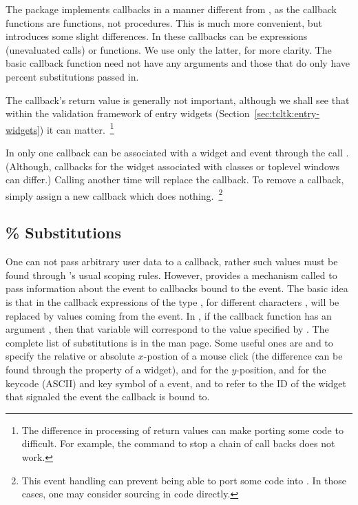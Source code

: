 The  package implements callbacks in a manner different
from \TK, as the callback functions are \R\/ functions, not \TK\/
procedures. This is much more convenient, but introduces some slight
differences.  In  these callbacks can be expressions
(unevaluated calls) or functions. We use only the latter, for more
clarity. The basic callback function need not have any arguments and
those that do only have percent substitutions passed in.


The callback's return value is generally not important, although we
shall see that within the validation framework of entry widgets
(Section~\ref{sec:tcltk:entry-widgets}) it can matter.~\footnote{The
  difference in processing of return values can make porting some
  \Tk\/ code to  difficult. For example, the 
  command to stop a chain of call backs does not work.}



In  only one callback can be associated with a widget and
event through the call
. (Although, callbacks for the
widget associated with classes or toplevel windows can differ.)
Calling  another time will replace the callback. To
remove a callback, simply assign a new callback which does
nothing.~\footnote{This event handling can prevent being able to port
  some \Tk\/ code into . In those cases, one may consider
  sourcing in \Tcl\/ code directly.}



\subsection{\% Substitutions}
\label{sec:tcltk-percent-substitutions}

One can not pass arbitrary user data to a callback, rather such values
must be found through \R's usual scoping rules. However, \TK\/
provides a mechanism called  to pass
information about the event to callbacks bound to the event. The basic
idea is that in the \TCL\/ callback expressions of the type
, for different characters , will be replaced by values
coming from the event. In , if the callback function has an
argument , then that variable will correspond to the value
specified by . The complete list of substitutions is in the
 man page. Some useful ones are  and  to
specify the relative or absolute $x$-postion of a mouse click (the
difference can be found through the  property of a
widget),  and  for the $y$-position,  and
 for the keycode (ASCII) and key symbol of a
 event, and  to refer to the ID of the
widget that signaled the event the callback is bound
to. 

